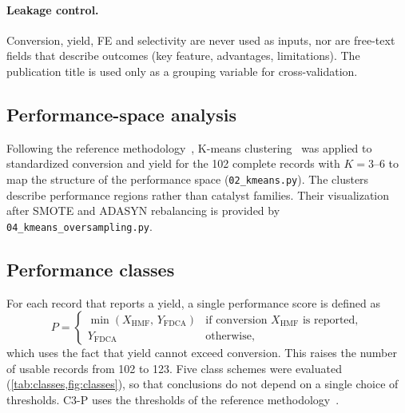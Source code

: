 \documentclass[10pt,a4paper]{article}
\begin{document}
\paragraph{Leakage control.} Conversion, yield, FE and selectivity are never
used as inputs, nor are free-text fields that describe outcomes (key feature,
advantages, limitations). The publication title is used only as a grouping
variable for cross-validation.

\subsection{Performance-space analysis}
\label{sec:kmeans}

Following the reference methodology~\cite{li2025hmf}, K-means
clustering~\cite{lloyd1982kmeans} was applied to standardized conversion and
yield for the 102 complete records with $K = 3$--$6$ to map the structure of
the performance space (\texttt{02\_kmeans.py}). The clusters describe
performance regions rather than catalyst families. Their visualization after
SMOTE and ADASYN rebalancing is provided by \texttt{04\_kmeans\_oversampling.py}.

\subsection{Performance classes}
\label{sec:classes}

For each record that reports a yield, a single performance score is defined as
\begin{equation}
  P = \begin{cases}
      \min(X_{\text{HMF}},\, Y_{\text{FDCA}}) & \text{if conversion } X_{\text{HMF}} \text{ is reported},\\
      Y_{\text{FDCA}} & \text{otherwise},
      \end{cases}
  \label{eq:perf}
\end{equation}
which uses the fact that yield cannot exceed conversion. This raises the number
of usable records from 102 to 123. Five class schemes were evaluated
(\cref{tab:classes,fig:classes}), so that conclusions do not depend on a single
choice of thresholds. C3-P uses the thresholds of the reference
methodology~\cite{li2025hmf}.
\end{document}
